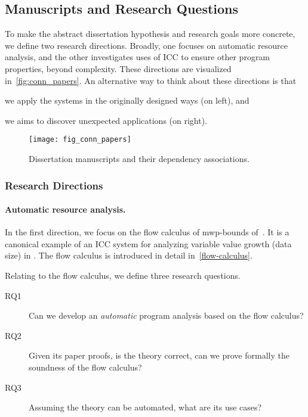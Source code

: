 \subsection{Manuscripts and Research Questions}
\label{subsec:conn-papers}

To make the abstract dissertation hypothesis and research goals more concrete,
we define two research directions. Broadly, one focuses on automatic resource
analysis, and the other investigates uses of ICC to ensure other program
properties, beyond complexity. These directions are visualized
in~\autoref{fig:conn_papers}. An alternative way to think about these directions
is that
\begin{enumerate*}
\item we apply the systems in the originally designed ways (on left), and
\item we aims to discover unexpected applications (on right).
\end{enumerate*}

\begin{figure}[p]
\texttt{[image: fig\_conn\_papers]}\vspace{1em}
\caption[Dissertation manuscripts and their associations]
{Dissertation manuscripts and their dependency associations.}
\label{fig:conn_papers}
\end{figure}

\subsubsection{Research Directions}
\label{sssec:directions}

\paragraph*{Automatic resource analysis.}

In the first direction, we focus on the flow calculus of mwp-bounds
of~\textcite{jones2009}. It is a canonical example of an ICC system for
analyzing variable value growth (data size) in . The
flow calculus is introduced in detail in~\autoref{flow-calculus}.

Relating to the flow calculus, we define three research questions.
\begin{description}
\item[RQ1] Can we develop an \emph{automatic} program analysis based on the flow calculus?
\item[RQ2] Given its paper proofs, is the theory correct, \ie can we prove formally the soundness of the flow calculus?
\item[RQ3] Assuming the theory can be automated, what are its use cases?
\end{description}

